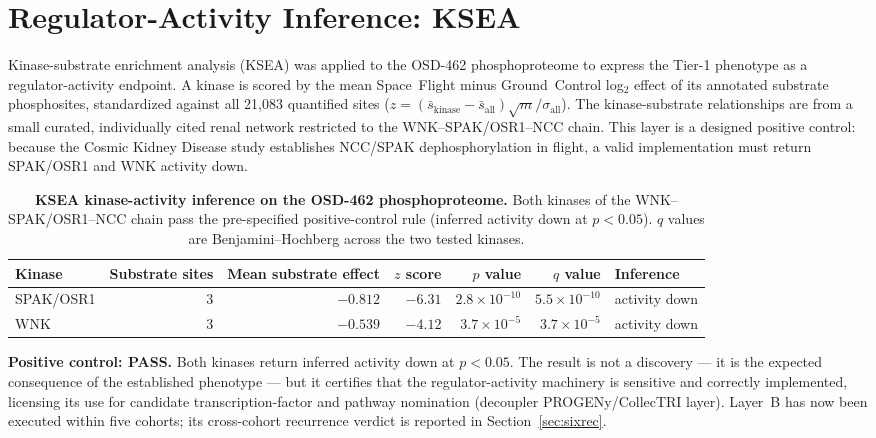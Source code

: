 \documentclass[10pt]{article}
\begin{document}
\section{Regulator-Activity Inference: KSEA}

Kinase-substrate enrichment analysis (KSEA) was applied to the OSD-462 phosphoproteome to express the Tier-1 phenotype as a regulator-activity endpoint. A kinase is scored by the mean Space~Flight minus Ground~Control log$_2$ effect of its annotated substrate phosphosites, standardized against all 21{,}083 quantified sites ($z=(\bar{s}_{\mathrm{kinase}}-\bar{s}_{\mathrm{all}})\sqrt{m}/\sigma_{\mathrm{all}}$). The kinase-substrate relationships are from a small curated, individually cited renal network restricted to the WNK--SPAK/OSR1--NCC chain. This layer is a designed positive control: because the Cosmic Kidney Disease study establishes NCC/SPAK dephosphorylation in flight, a valid implementation must return SPAK/OSR1 and WNK activity down.

\begin{table}[H]
\centering\small
\caption{\textbf{KSEA kinase-activity inference on the OSD-462 phosphoproteome.} Both kinases of the WNK--SPAK/OSR1--NCC chain pass the pre-specified positive-control rule (inferred activity down at $p<0.05$). $q$ values are Benjamini--Hochberg across the two tested kinases.}
\label{tab:kseafull}
\begin{tabular}{lrrrrrl}
\toprule
Kinase & Substrate sites & Mean substrate effect & $z$ score & $p$ value & $q$ value & Inference \\
\midrule
SPAK/OSR1 & 3 & $-0.812$ & $-6.31$ & $2.8\times10^{-10}$ & $5.5\times10^{-10}$ & activity down \\
WNK & 3 & $-0.539$ & $-4.12$ & $3.7\times10^{-5}$ & $3.7\times10^{-5}$ & activity down \\
\bottomrule
\end{tabular}
\end{table}

\noindent
\textbf{Positive control: PASS.} Both kinases return inferred activity down at $p<0.05$. The result is not a discovery --- it is the expected consequence of the established phenotype --- but it certifies that the regulator-activity machinery is sensitive and correctly implemented, licensing its use for candidate transcription-factor and pathway nomination (decoupler PROGENy/CollecTRI layer). Layer~B has now been executed within five cohorts; its cross-cohort recurrence verdict is reported in Section~\ref{sec:sixrec}.
\end{document}
